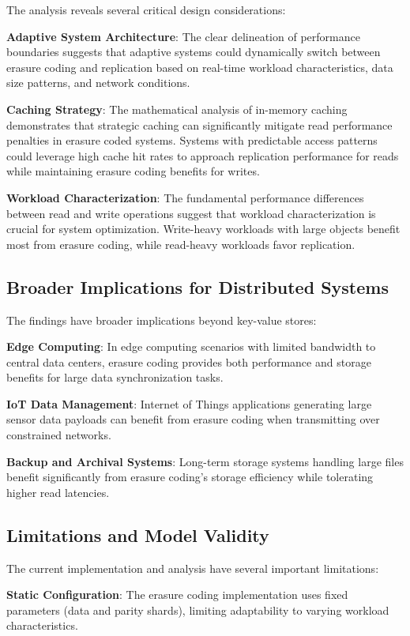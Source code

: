The analysis reveals several critical design considerations:

\textbf{Adaptive System Architecture}: The clear delineation of performance boundaries suggests that adaptive systems could dynamically switch between erasure coding and replication based on real-time workload characteristics, data size patterns, and network conditions.

\textbf{Caching Strategy}: The mathematical analysis of in-memory caching demonstrates that strategic caching can significantly mitigate read performance penalties in erasure coded systems. Systems with predictable access patterns could leverage high cache hit rates to approach replication performance for reads while maintaining erasure coding benefits for writes.

\textbf{Workload Characterization}: The fundamental performance differences between read and write operations suggest that workload characterization is crucial for system optimization. Write-heavy workloads with large objects benefit most from erasure coding, while read-heavy workloads favor replication.

\subsection{Broader Implications for Distributed Systems}

The findings have broader implications beyond key-value stores:

\textbf{Edge Computing}: In edge computing scenarios with limited bandwidth to central data centers, erasure coding provides both performance and storage benefits for large data synchronization tasks.

\textbf{IoT Data Management}: Internet of Things applications generating large sensor data payloads can benefit from erasure coding when transmitting over constrained networks.

\textbf{Backup and Archival Systems}: Long-term storage systems handling large files benefit significantly from erasure coding's storage efficiency while tolerating higher read latencies.

\subsection{Limitations and Model Validity}

The current implementation and analysis have several important limitations:

\textbf{Static Configuration}: The erasure coding implementation uses fixed parameters (data and parity shards), limiting adaptability to varying workload characteristics.


